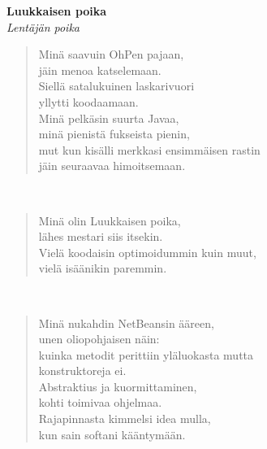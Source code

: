 \noindent\begin{minipage}{\linewidth}
\vspace{5pt}
\parbox[t]{0.85\linewidth}{\raggedright {\large\bf Luukkaisen poika}\\[2pt]\small\emph{Lentäjän poika}\\[6pt]}
\begin{verse}
	
	Minä saavuin OhPen pajaan,\\
	jäin menoa katselemaan.\\
	Siellä satalukuinen laskarivuori\\
	yllytti koodaamaan.\\
	Minä pelkäsin suurta Javaa,\\
	minä pienistä fukseista pienin,\\
	mut kun kisälli merkkasi ensimmäisen rastin\\
	jäin seuraavaa himoitsemaan.\\
\end{verse}
\end{minipage}\\[10pt]
\noindent\begin{minipage}{\linewidth}
\begin{verse}
	Minä olin Luukkaisen poika,\\
	lähes mestari siis itsekin.\\
	Vielä koodaisin optimoidummin kuin muut,\\
	vielä isäänikin paremmin.\\
\end{verse}
\end{minipage}\\[10pt]
\noindent\begin{minipage}{\linewidth}
\begin{verse}
	Minä nukahdin NetBeansin ääreen,\\
	unen oliopohjaisen näin:\\
	kuinka metodit perittiin yläluokasta mutta\\
	konstruktoreja ei.\\
	Abstraktius ja kuormittaminen,\\
	kohti toimivaa ohjelmaa.\\
	Rajapinnasta kimmelsi idea mulla,\\
	kun sain softani kääntymään.\\
\end{verse}
\end{minipage}\\[10pt]
